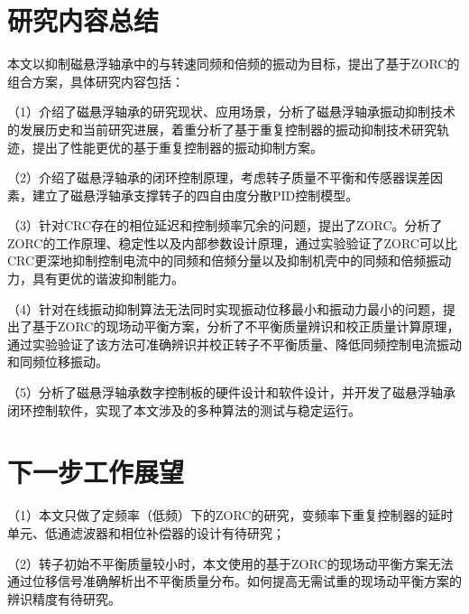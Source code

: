 \documentclass[
  lang=cn,
  degree=master,
  openany,oneside
]{nuaathesis}
\begin{document}
\section{研究内容总结}

本文以抑制磁悬浮轴承中的与转速同频和倍频的振动为目标，提出了基于ZORC的组合方案，具体研究内容包括：

（1）介绍了磁悬浮轴承的研究现状、应用场景，分析了磁悬浮轴承振动抑制技术的发展历史和当前研究进展，着重分析了基于重复控制器的振动抑制技术研究轨迹，提出了性能更优的基于重复控制器的振动抑制方案。

（2）介绍了磁悬浮轴承的闭环控制原理，考虑转子质量不平衡和传感器误差因素，建立了磁悬浮轴承支撑转子的四自由度分散PID控制模型。

（3）针对CRC存在的相位延迟和控制频率冗余的问题，提出了ZORC。分析了ZORC的工作原理、稳定性以及内部参数设计原理，通过实验验证了ZORC可以比CRC更深地抑制控制电流中的同频和倍频分量以及抑制机壳中的同频和倍频振动力，具有更优的谐波抑制能力。

（4）针对在线振动抑制算法无法同时实现振动位移最小和振动力最小的问题，提出了基于ZORC的现场动平衡方案，分析了不平衡质量辨识和校正质量计算原理，通过实验验证了该方法可准确辨识并校正转子不平衡质量、降低同频控制电流振动和同频位移振动。

（5）分析了磁悬浮轴承数字控制板的硬件设计和软件设计，并开发了磁悬浮轴承闭环控制软件，实现了本文涉及的多种算法的测试与稳定运行。

\section{下一步工作展望}

（1）本文只做了定频率（低频）下的ZORC的研究，变频率下重复控制器的延时单元、低通滤波器和相位补偿器的设计有待研究；

（2）转子初始不平衡质量较小时，本文使用的基于ZORC的现场动平衡方案无法通过位移信号准确解析出不平衡质量分布。如何提高无需试重的现场动平衡方案的辨识精度有待研究。

%
%
%
%

\appendix
%

\backmatter
%



\end{document}

